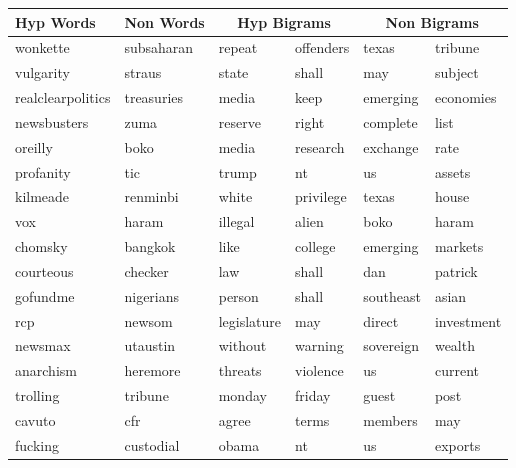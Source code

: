 \documentclass[11pt,a4paper]{article}
\begin{document}
\begin{table}[ht]
\centering
\begin{tabular}{l|l|ll|ll}
\toprule
Hyp Words        & Non Words         & \multicolumn{2}{c}{Hyp Bigrams}  & \multicolumn{2}{c}{Non Bigrams}   \\ \midrule
wonkette          & subsaharan        & repeat      & offenders   & texas         & tribune      \\
vulgarity         & straus            & state       & shall       & may           & subject      \\
realclearpolitics & treasuries        & media       & keep        & emerging      & economies    \\
newsbusters       & zuma              & reserve     & right       & complete      & list         \\
oreilly           & boko              & media       & research    & exchange      & rate         \\
profanity         & tic               & trump       & nt          & us            & assets       \\
kilmeade          & renminbi          & white       & privilege   & texas         & house        \\
vox               & haram             & illegal     & alien       & boko          & haram        \\
chomsky           & bangkok           & like        & college     & emerging      & markets      \\
courteous         & checker           & law         & shall       & dan           & patrick      \\
gofundme          & nigerians         & person      & shall       & southeast     & asian        \\
rcp               & newsom            & legislature & may         & direct        & investment   \\
newsmax           & utaustin          & without     & warning     & sovereign     & wealth       \\
anarchism         & heremore          & threats     & violence    & us            & current      \\
trolling          & tribune           & monday      & friday      & guest         & post         \\
cavuto            & cfr               & agree       & terms       & members       & may          \\
fucking           & custodial         & obama       & nt          & us            & exports      \\

\end{tabular}
\end{table}
\end{document}
